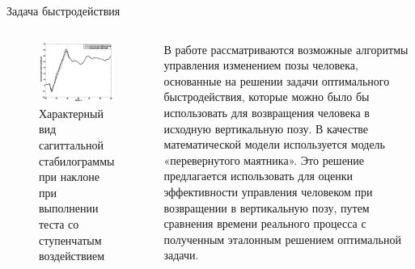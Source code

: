 \documentclass[10pt]{beamer}
\begin{document}
\begin{frame}{Задача быстродействия}
	\begin{columns}
		\begin{figure}[h!]
			\includegraphics[width=1\linewidth]{images/stabilos.png}
			\caption{Характерный вид сагиттальной стабилограммы при наклоне при выполнении теста со ступенчатым воздействием\cite{PAKrychinin}}
		\end{figure}
		В работе рассматриваются возможные алгоритмы управления изменением
		позы человека, основанные на решении задачи оптимального быстродействия,
		которые можно было бы использовать для возвращения человека в исходную 
		вертикальную позу. В качестве математической модели используется модель
		«перевернутого маятника». Это решение предлагается использовать для
		оценки эффективности управления человеком при возвращении в
		вертикальную позу, путем сравнения времени реального процесса с полученным
		эталонным решением оптимальной задачи.
	\end{columns}
\end{frame}
\end{document}
